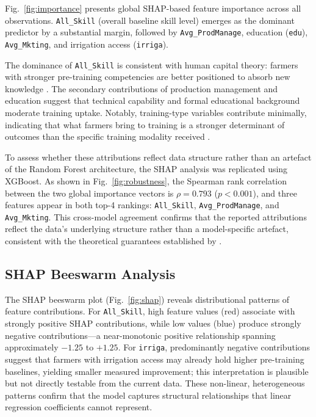 \documentclass[3p,twocolumn,authoryear]{elsarticle}
\begin{document}
Fig.~\ref{fig:importance} presents global SHAP-based feature importance
across all observations.
\texttt{All\_Skill} (overall baseline skill level) emerges as the
dominant predictor by a substantial margin, followed by
\texttt{Avg\_ProdManage}, education (\texttt{edu}),
\texttt{Avg\_Mkting}, and irrigation access (\texttt{irriga}).

The dominance of \texttt{All\_Skill} is consistent with human capital
theory: farmers with stronger pre-training competencies are better
positioned to absorb new knowledge \citep{feder1985}.
The secondary contributions of production management and education
suggest that technical capability and formal educational background
moderate training uptake.
Notably, training-type variables contribute minimally, indicating that
what farmers bring to training is a stronger determinant of outcomes
than the specific training modality received \citep{ryo2022}.

To assess whether these attributions reflect data structure rather than
an artefact of the Random Forest architecture, the SHAP analysis was
replicated using XGBoost.
As shown in Fig.~\ref{fig:robustness}, the Spearman rank correlation
between the two global importance vectors is $\rho = 0.793$
($p < 0.001$), and three features appear in both top-4 rankings:
\texttt{All\_Skill}, \texttt{Avg\_ProdManage}, and \texttt{Avg\_Mkting}.
This cross-model agreement confirms that the reported attributions
reflect the data's underlying structure rather than a model-specific
artefact, consistent with the theoretical guarantees established by
\citet{lundberg2020}.

\subsection{SHAP Beeswarm Analysis}

The SHAP beeswarm plot (Fig.~\ref{fig:shap}) reveals distributional
patterns of feature contributions.
For \texttt{All\_Skill}, high feature values (red) associate with
strongly positive SHAP contributions, while low values (blue) produce
strongly negative contributions---a near-monotonic positive relationship
spanning approximately $-1.25$ to $+1.25$.
For \texttt{irriga}, predominantly negative contributions suggest that
farmers with irrigation access may already hold higher pre-training
baselines, yielding smaller measured improvement; this interpretation
is plausible but not directly testable from the current data.
These non-linear, heterogeneous patterns confirm that the model captures
structural relationships that linear regression coefficients cannot
represent.
\end{document}
